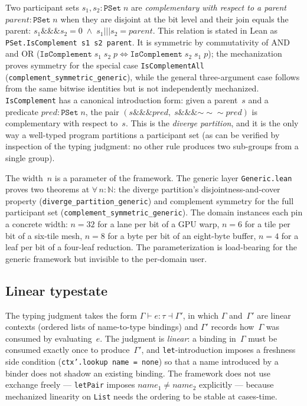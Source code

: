 \documentclass[acmsmall,screen,review,anonymous,nonacm]{acmart}
\newcommand{\PSet}{\texttt{PSet}}
\newcommand{\IsComplement}{\texttt{IsComplement}}
\newcommand{\IsComplementAll}{\texttt{IsComplementAll}}
\begin{document}
Two participant sets $s_1, s_2 : \PSet\;n$ are \emph{complementary with respect to a parent} $\mathit{parent} : \PSet\;n$ when they are disjoint at the bit level and their join equals the parent: $s_1 \mathbin{\&\&\&} s_2 = 0 \;\land\; s_1 \mathbin{|||} s_2 = \mathit{parent}$. This relation is stated in Lean as \texttt{PSet.IsComplement s1 s2 parent}. It is symmetric by commutativity of AND and OR ($\IsComplement\;s_1\;s_2\;p \iff \IsComplement\;s_2\;s_1\;p$); the mechanization proves symmetry for the special case \IsComplementAll{} (\texttt{complement\_symmetric\_generic}), while the general three-argument case follows from the same bitwise identities but is not independently mechanized. \IsComplement{} has a canonical introduction form: given a parent~$s$ and a predicate $\mathit{pred} : \PSet\;n$, the pair $(s \mathbin{\&\&\&} \mathit{pred},\; s \mathbin{\&\&\&} {\mathord{\sim\!\sim\!\sim}\mathit{pred}})$ is complementary with respect to~$s$. This is the \emph{diverge partition}, and it is the only way a well-typed program partitions a participant set (as can be verified by inspection of the typing judgment: no other rule produces two sub-groups from a single group).

The width~$n$ is a parameter of the framework. The generic layer \texttt{Generic.lean} proves two theorems at $\forall\,n : \mathbb{N}$: the diverge partition's disjointness-and-cover property (\texttt{diverge\_partition\_generic}) and complement symmetry for the full participant set (\texttt{complement\_symmetric\_generic}). The domain instances each pin a concrete width: $n = 32$ for a lane per bit of a GPU warp, $n = 6$ for a tile per bit of a six-tile mesh, $n = 8$ for a byte per bit of an eight-byte buffer, $n = 4$ for a leaf per bit of a four-leaf reduction. The parameterization is load-bearing for the generic framework but invisible to the per-domain user.

\subsection{Linear typestate}\label{sec:linear-typestate}

The typing judgment takes the form $\Gamma \vdash e : \tau \dashv \Gamma'$, in which $\Gamma$ and~$\Gamma'$ are linear contexts (ordered lists of name-to-type bindings) and $\Gamma'$ records how~$\Gamma$ was consumed by evaluating~$e$. The judgment is \emph{linear}: a binding in~$\Gamma$ must be consumed exactly once to produce~$\Gamma'$, and \texttt{let}-introduction imposes a freshness side condition (\texttt{ctx'.lookup name = none}) so that a name introduced by a binder does not shadow an existing binding. The framework does not use exchange freely --- \texttt{letPair} imposes $\mathit{name}_1 \neq \mathit{name}_2$ explicitly --- because mechanized linearity on \texttt{List} needs the ordering to be stable at cases-time.
\end{document}
